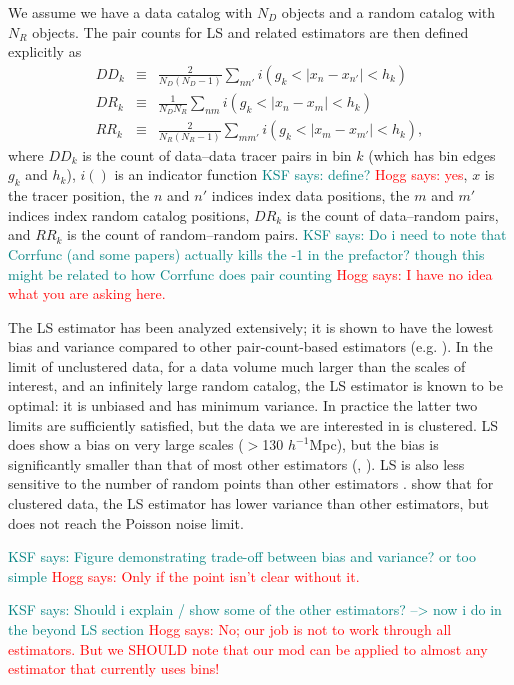 \documentclass[modern]{aastex62}
\newcommand{\LS}{LS\xspace}
\newcommand{\hmpc}{$h^{-1}$Mpc}
\newcommand{\KSF}[1]{\textcolor{teal}{KSF says: #1}}
\newcommand{\hogg}[1]{\textcolor{red}{Hogg says: #1}}
\begin{document}
We assume we have a data catalog with $N_D$ objects and a random catalog with $N_R$ objects.
The pair counts for \LS and related estimators are then defined explicitly as
\begin{eqnarray}\displaystyle
DD_k &\equiv& \frac{2}{N_D(N_D-1)} \sum_{n n'} i(g_k < |x_n - x_{n'}| < h_k) \\
DR_k &\equiv& \frac{1}{N_D N_R} \sum_{n m} i(g_k < |x_n - x_m| < h_k) \\
RR_k &\equiv& \frac{2}{N_R(N_R-1)} \sum_{m m'} i(g_k < |x_m - x_{m'}| < h_k),
\end{eqnarray}
where $DD_k$ is the count of data--data tracer pairs in bin $k$ (which has bin edges $g_k$ and $h_k$), $i()$ is an indicator function \KSF{define?} \hogg{yes}, $x$ is the tracer position, the $n$ and $n'$ indices index data positions, the $m$ and $m'$ indices index random catalog positions, $DR_k$ is the count of data--random pairs, and $RR_k$ is the count of random--random pairs.
\KSF{Do i need to note that Corrfunc (and some papers) actually kills the -1 in the prefactor? though this might be related to how Corrfunc does pair counting} \hogg{I have no idea what you are asking here.}

The \LS estimator has been analyzed extensively; it is shown to have the lowest bias and variance compared to other pair-count-based estimators (e.g. \citealt{Kerscher2000}).
In the limit of unclustered data, for a data volume much larger than the scales of interest, and an infinitely large random catalog, the \LS estimator is known to be optimal: it is unbiased and has minimum variance.
In practice the latter two limits are sufficiently satisfied, but the data we are interested in is clustered.
\LS does show a bias on very large scales ($>$130 \hmpc), but the bias is significantly smaller than that of most other estimators (\citealt{Kerscher1999}, \citealt{VargasMagana2013}).
\LS is also less sensitive to the number of random points than other estimators \citep{Kerscher2000}.
\cite{VargasMagana2013} show that for clustered data, the \LS estimator has lower variance than other estimators, but does not reach the Poisson noise limit.

\KSF{Figure demonstrating trade-off between bias and variance? or too simple} \hogg{Only if the point isn't clear without it.}

\KSF{Should i explain / show some of the other estimators? --> now i do in the beyond LS section} \hogg{No; our job is not to work through all estimators. But we SHOULD note that our mod can be applied to almost any estimator that currently uses bins!}
\end{document}
